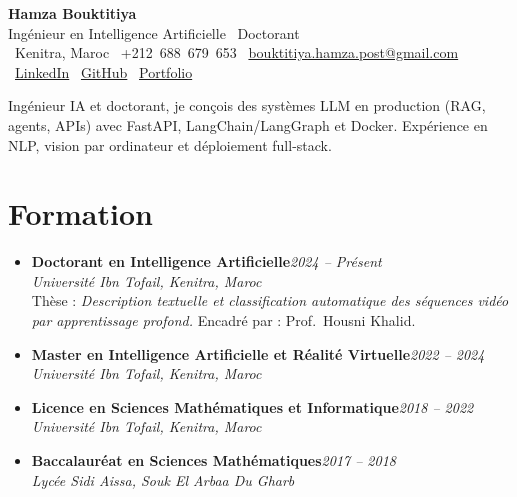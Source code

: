 \documentclass[10pt,a4paper]{article}
\newcommand{\cvname}[1]{{\Huge\bfseries\color{ink}#1}}
\newcommand{\cvtitle}[1]{{\large\color{muted}#1}}
\newcommand{\cvmeta}[1]{{\footnotesize\color{muted}#1}}
\newcommand{\role}[2]{\textbf{#1}\hfill\textit{\color{muted}#2}\\}
\newcommand{\org}[1]{\textit{#1}\\[0.5pt]}
\begin{document}
\normalsize
\setlength{\tabcolsep}{0pt}

\begin{center}
    \cvname{Hamza Bouktitiya}\\[2pt]
    \cvtitle{Ingénieur en Intelligence Artificielle \textbullet\ Doctorant}\\[4pt]
    \cvmeta{%
        \faMapMarker*\ Kenitra, Maroc
        \quad\textbullet\quad
        \faPhone*\ +212~688~679~653
        \quad\textbullet\quad
        \faEnvelope*\ \href{mailto:bouktitiya.hamza.post@gmail.com}{bouktitiya.hamza.post@gmail.com}
    }\\[2pt]
    \cvmeta{%
        \faLinkedin*\ \href{https://www.linkedin.com/in/hamza-bouktitiya-604471253/}{LinkedIn}
        \quad\textbullet\quad
        \faGithub*\ \href{https://github.com/gothamza}{GitHub}
        \quad\textbullet\quad
        \faGlobe*\ \href{https://gothamza.github.io/portfolio/}{Portfolio}
    }
\end{center}

\vspace{1pt}
{\footnotesize\color{ink}
Ingénieur IA et doctorant, je conçois des systèmes LLM en production (RAG, agents, APIs) avec FastAPI, LangChain/LangGraph et Docker. Expérience en NLP, vision par ordinateur et déploiement full-stack.}

\section*{Formation}
\begin{itemize}
    \item \role{Doctorant en Intelligence Artificielle}{2024 -- Présent}
          \org{Université Ibn Tofail, Kenitra, Maroc}
          Thèse : \textit{Description textuelle et classification automatique des séquences vidéo par apprentissage profond.}
          Encadré par : Prof.\ Housni Khalid.

    \item \role{Master en Intelligence Artificielle et Réalité Virtuelle}{2022 -- 2024}
          \org{Université Ibn Tofail, Kenitra, Maroc}

    \item \role{Licence en Sciences Mathématiques et Informatique}{2018 -- 2022}
          \org{Université Ibn Tofail, Kenitra, Maroc}

    \item \role{Baccalauréat en Sciences Mathématiques}{2017 -- 2018}
          \org{Lycée Sidi Aissa, Souk El Arbaa Du Gharb}
\end{itemize}
\end{document}
